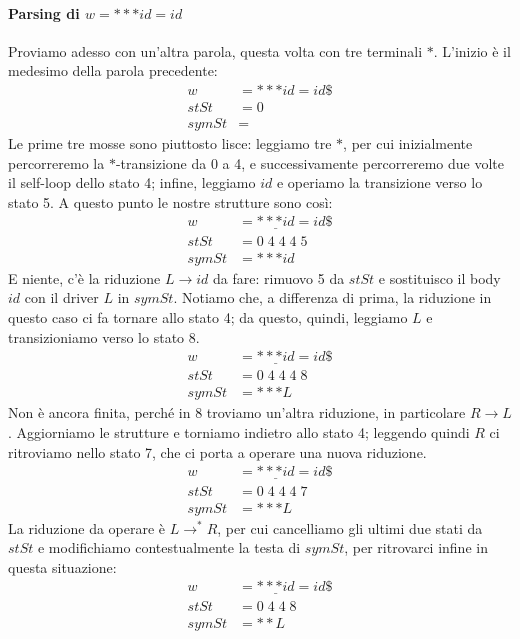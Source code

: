 \documentclass[class=book, crop=false, oneside, 12pt]{standalone}
\begin{document}
\paragraph{Parsing di \(w = ***id\!=\!id\)}
Proviamo adesso con un'altra parola, questa volta con tre terminali \(\ast\). L'inizio è il medesimo della parola precedente:
\begin{align*}
    w &= ***id\!=\!id\$ \\
    stSt &= 0 \\
    symSt &=  
\end{align*}
Le prime tre mosse sono piuttosto lisce: leggiamo tre \(\ast\), per cui inizialmente percorreremo la \(\ast\)-transizione da 0 a 4, e successivamente percorreremo due volte il self-loop dello stato 4; infine, leggiamo \(id\) e operiamo la transizione verso lo stato 5. A questo punto le nostre strutture sono così:
\begin{align*}
    w &= \underline{***id}\!=id\$ \\
    stSt &= 0\;4\;4\;4\;5 \\
    symSt &= ***id 
\end{align*}
E niente, c'è la riduzione \(L \to id\) da fare: rimuovo 5 da \(stSt\) e sostituisco il body \(id\) con il driver \(L\) in \(symSt\). Notiamo che, a differenza di prima, la riduzione in questo caso ci fa tornare allo stato 4; da questo, quindi, leggiamo \(L\) e transizioniamo verso lo stato 8.
\begin{align*}
    w &= \underline{***id}\!=id\$ \\
    stSt &= 0\;4\;4\;4\;8 \\
    symSt &= ***L 
\end{align*}
Non è ancora finita, perché in 8 troviamo un'altra riduzione, in particolare \(R \to L\). Aggiorniamo le strutture e torniamo indietro allo stato 4; leggendo quindi \(R\) ci ritroviamo nello stato 7, che ci porta a operare una nuova riduzione.
\begin{align*}
    w &= \underline{***id}\!=id\$ \\
    stSt &= 0\;4\;4\;4\;7 \\
    symSt &= ***L 
\end{align*}
La riduzione da operare è \(L \to ^{*}R\), per cui cancelliamo gli ultimi due stati da \(stSt\) e modifichiamo contestualmente la testa di \(symSt\), per ritrovarci infine in questa situazione:
\begin{align*}
    w &= \underline{***id}\!=id\$ \\
    stSt &= 0\;4\;4\;8 \\
    symSt &= **L 
\end{align*}
\end{document}
